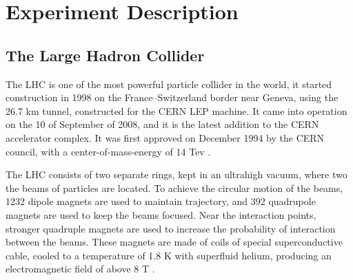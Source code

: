 \chapter{Experiment Description }

\section{The Large Hadron Collider}

The LHC is one of the most powerful particle collider in the world, it started construction in 1998 on the France–Switzerland border near Geneva, using the 26.7 km tunnel, constructed for the CERN LEP machine. It came into operation on the 10 of September of 2008, and it is the latest addition to the CERN accelerator complex. It was first approved on December 1994 by the CERN council, with  a center-of-mass-energy of 14 Tev \cite{Bruning:782076}.

The LHC consists of two separate rings, kept in an ultrahigh vacuum, where two the beams of particles are located. To achieve the circular motion of the beams, 1232 dipole magnets are used to maintain trajectory, and 392 quadrupole magnets are used to keep the beams focused. Near the interaction points, stronger quadruple magnets are used to increase the probability of interaction between the beams.  These magnets are made of coils of special superconductive cable, cooled to a temperature of 1.8 K with superfluid helium, producing an electromagnetic field of above 8 T \cite{Bruning:782076}.

